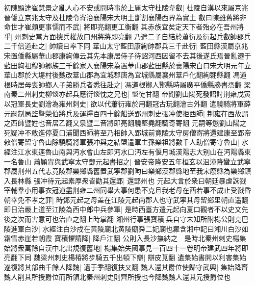 初陳顯逹崔慧景之亂人心不安或問時事於上庸太守杜陵韋叡|{
	杜陵自漢以來屬京兆晉僑立京兆太守及杜陵令寄治襄陽宋大明土斷割襄陽西界為實土}
叡曰陳雖舊將非命世才崔頗更事懦而不武|{
	將即亮翻更工衡翻}
其赤族宜矣定天下者殆必在吾州將乎|{
	州刺史當方面摠兵權故曰州將將即亮翻}
乃遣二子自結於蕭衍及衍起兵叡帥郡兵二千倍道赴之|{
	帥讀曰率下同}
華山太守藍田康絢帥郡兵三千赴衍|{
	藍田縣漢屬京兆宋置僑縣屬華山郡康絢傳云其先本康居侍子待詔河西因留不去其後遂氏焉晉亂遷于藍田絢祖穆帥郷族三千餘家入襄陽宋為置華山郡藍田縣於襄陽宋白曰宋大明元年立華山郡於大堤村後魏改華山郡為宜城郡唐為宜城縣屬襄州華戶化翻絢翾縣翻}
馮道根時居母喪帥鄉人子弟勝兵者悉往赴之|{
	馮道根酇人酇縣時屬廣平僑縣勝書烝翻}
梁南秦二州刺史柳惔亦起兵應衍惔忱之兄也|{
	惔徒甘翻}
帝聞劉山陽死發詔討荆雍戊寅以冠軍長史劉澮為雍州刺史|{
	欲以代蕭衍雍於用翻冠古玩翻澮古外翻}
遣驍騎將軍薛元嗣制局監暨榮伯將兵及運糧百四十餘船送郢州刺史張冲使拒西師|{
	荆雍在西故謂之西師暨姓也音居乙翻又泉暨二音將即亮翻驍堅堯翻騎奇寄翻}
元嗣等懲劉山陽之死疑冲不敢進停夏口浦聞西師將至乃相帥入郢城前竟陵太守房僧寄將還建康至郢帝敕僧寄留守魯山除驍騎將軍張冲與之結盟遣軍主孫樂祖將數千人助僧寄守魯山|{
	水經注江水東逕魯山南與沔水會山左即沔水口沔左有偃月城漢陽志大别山在沔陽縣東一名魯山}
蕭頴胄與武寧太守鄧元起書招之|{
	晉安帝隆安五年桓玄以沮漳降蠻立武寧郡屬荆州五代志竟陵郡樂鄉縣舊置武寜郡劉昫曰樂鄉漢郡縣地至我宋廢縣為樂鄉鎮入長林縣}
張冲待元起素厚衆皆勸其還郢|{
	還郢州也}
元起大言於衆曰朝廷暴虐誅戮宰輔羣小用事衣冠道盡荆雍二州同舉大事何患不克且我老母在西若事不成止受戮昏朝幸免不孝之罪|{
	時鄧元起之母盖在江陵元起南郡人也守武寜其母留鄉里朝直遥翻}
即日治嚴上道至江陵為西中郎中兵參軍|{
	是時西臺方遣元起向夏口觀者不以史文先後之次而害意可也治直之翻上時掌翻}
湘州行事張寶積兵自守未知所附楊公則克巴陵進軍白沙|{
	水經注白沙戍在黄陵廟北黄陵廟舜二妃廟也羅含湘中記曰湘川白沙如霜雪赤崖若朝霞}
寶積懼請降|{
	降戶江翻}
公則入長沙撫納之　是時北秦州刺史楊集始將衆萬餘自漢中北出規復舊地|{
	楊集始失國事見一百四十一卷明帝建武四年將即亮翻下同}
魏梁州刺史楊椿將步騎五千出頓下辯|{
	辯皮莧翻}
遺集始書開以利害集始遂復將其部曲千餘人降魏|{
	遺于季翻復扶又翻}
魏人還其爵位使歸守武興|{
	集始降齊魏人削其所授爵位而所領北秦州刺史則齊所授也今降魏魏人還其元授爵位也}


